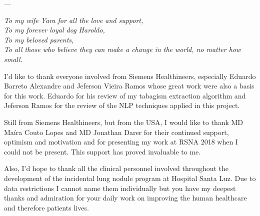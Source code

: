\documentclass[
	12pt,				%
	openany,			%
  oneside,      %
	a4paper,			%
	brazil,			%
	french,			%
	spanish,			%
	english       %
	]{abntex2}
\newcommand{\nomeHsl}{Hospital Santa Luz}
\begin{document}

\frenchspacing 


\imprimircapa

\imprimirfolhaderosto





 ---
\begin{dedicatoria}
  \centering
  \noindent
  \textit{To my wife Yara for all the love and support,\\To my forever loyal dog Haroldo,\\To my beloved parents,\\To all those who believe they can make a change in the world, no matter how small.}
  \vspace*{\fill}
\end{dedicatoria}

\begin{agradecimentos}
  I'd like to thank everyone involved from Siemens Healthineers, especially Eduardo Barreto Alexandre and Jeferson Vieira Ramos whose great work were also a basis for this work. Eduardo for his review of my tabagism extraction algorithm and Jeferson Ramos for the review of the NLP techniques applied in this project.

  Still from Siemens Healthineers, but from the USA, I would like to thank MD Maíra Couto Lopes and MD Jonathan Darer for their continued support, optimism and motivation and for presenting my work at RSNA 2018 when I could not be present. This support has proved invaluable to me.

  Also, I'd hope to thank all the clinical personnel involved throughout the development of the incidental lung nodule program at \nomeHsl{}. Due to data restrictions I cannot name them individually but you have my deepest thanks and admiration for your daily work on improving the human healthcare and therefore patients lives.
\end{agradecimentos}
\end{document}
